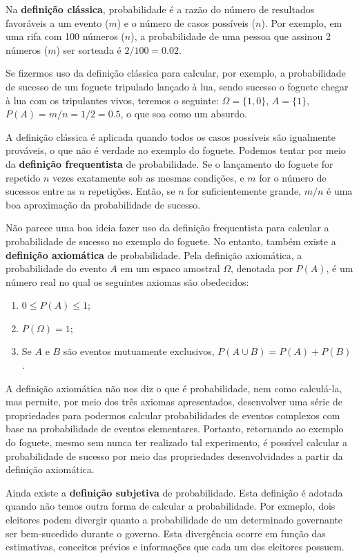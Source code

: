 Na \textbf{definição clássica}, probabilidade é a razão do número de resultados favoráveis a um evento ($m$) e o número de casos possíveis ($n$). Por exemplo, em uma rifa com 100 números ($n$), a probabilidade de uma pessoa que assinou 2 números ($m$) ser sorteada é $2/100 = 0.02$. 

Se fizermos uso da definição clássica para calcular, por exemplo, a probabilidade de sucesso de um foguete tripulado lançado à lua, sendo sucesso o foguete chegar à lua com os tripulantes vivos, teremos o seguinte: $\Omega = \{ 1, 0\}$, $A = \{ 1\}$, $P(A) = m/n = 1/2 = 0.5$, o que soa como um absurdo.

A definição clássica é aplicada quando todos os casos possíveis são igualmente prováveis, o que não é verdade no exemplo do foguete. Podemos tentar por meio da \textbf{definição frequentista} de probabilidade. Se o lançamento do foguete for repetido $n$ vezes exatamente sob as mesmas condições, e $m$ for o número de sucessos entre as $n$ repetições. Então, se $n$ for suficientemente grande, $m/n$ é uma boa aproximação da probabilidade de sucesso. 

Não parece uma boa ideia fazer uso da definição frequentista para calcular a probabilidade de sucesso no exemplo do foguete. No entanto, também existe a \textbf{definição axiomática} de probabilidade. Pela definição axiomática, a probabilidade do evento $A$ em um espaco amostral $\Omega$, denotada por $P(A)$, é um número real no qual os seguintes axiomas são obedecidos:

\begin{enumerate}
    \item $0 \leq P(A) \leq 1$;
    \item $P(\Omega) = 1$;
    \item Se $A$ e $B$ são eventos mutuamente exclusivos, $P(A \cup B) = P(A) + P(B)$.
\end{enumerate}

A definição axiomática não nos diz o que é probabilidade, nem como calculá-la, mas permite, por meio dos três axiomas apresentados, desenvolver uma série de propriedades para podermos calcular probabilidades de eventos complexos com base na probabilidade de eventos elementares. Portanto, retornando ao exemplo do foguete, mesmo sem nunca ter realizado tal experimento, é possível calcular a probabilidade de sucesso por meio das propriedades desenvolvidades a partir da definição axiomática.

Ainda existe a \textbf{definição subjetiva} de probabilidade. Esta definição é adotada quando não temos outra forma de calcular a probabilidade. Por exmeplo, dois eleitores podem divergir quanto a probabilidade de um determinado governante ser bem-sucedido durante o governo. Esta divergência ocorre em função das estimativas, conceitos prévios e informações que cada um dos eleitores possuem.

